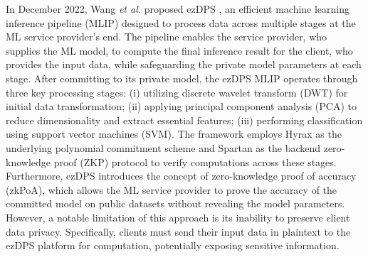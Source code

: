 \documentclass[journal]{IEEEtran}
\begin{document}
In December 2022, Wang \emph{et al.} proposed ezDPS \cite{wang2022ezdps}, an efficient machine learning inference pipeline (MLIP) designed to process data across multiple stages at the ML service provider's end. The pipeline enables the service provider, who supplies the ML model, to compute the final inference result for the client, who provides the input data, while safeguarding the private model parameters at each stage. After committing to its private model, the ezDPS MLIP operates through three key processing stages: (i) utilizing discrete wavelet transform (DWT) for initial data transformation; (ii) applying principal component analysis (PCA) to reduce dimensionality and extract essential features; (iii) performing classification using support vector machines (SVM). The framework employs Hyrax \cite{wahby2018doubly} as the underlying polynomial commitment scheme and Spartan \cite{setty2020spartan} as the backend zero-knowledge proof (ZKP) protocol to verify computations across these stages. Furthermore, ezDPS introduces the concept of zero-knowledge proof of accuracy (zkPoA), which allows the ML service provider to prove the accuracy of the committed model on public datasets without revealing the model parameters. However, a notable limitation of this approach is its inability to preserve client data privacy. Specifically, clients must send their input data in plaintext to the ezDPS platform for computation, potentially exposing sensitive information. 
\end{document}

